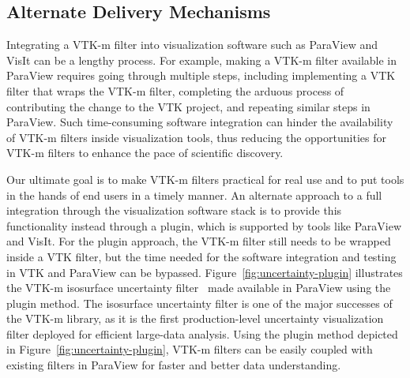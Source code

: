 
\subsection{Alternate Delivery Mechanisms}


Integrating a VTK-m filter into visualization software such as ParaView and VisIt can be a lengthy process. For example, making a VTK-m filter available in ParaView requires going through multiple steps, including implementing a VTK filter that wraps the VTK-m filter, completing the arduous process of contributing the change to the VTK project, and repeating similar steps in ParaView. Such time-consuming software integration can hinder the availability of VTK-m filters inside visualization tools, thus reducing the opportunities for VTK-m filters to enhance the pace of scientific discovery. 

Our ultimate goal is to make VTK-m filters practical for real use and to put tools in the hands of end users in a timely manner.
An alternate approach to a full integration through the visualization software stack is to provide this functionality instead through a plugin, which is supported by tools like ParaView and VisIt.
For the plugin approach, the VTK-m filter still needs to be wrapped inside a VTK filter, but the time needed for the software integration and testing in VTK and ParaView can be bypassed. Figure~\ref{fig:uncertainty-plugin} illustrates the VTK-m isosurface uncertainty filter~\cite{Wang2023, Athawale21} made available in ParaView using the plugin method. The isosurface uncertainty filter is one of the major successes of the VTK-m library, as it is the first production-level uncertainty visualization filter deployed for efficient large-data analysis. Using the plugin method depicted in Figure~\ref{fig:uncertainty-plugin}, VTK-m filters can be easily coupled with existing filters in ParaView for faster and better data understanding.       

